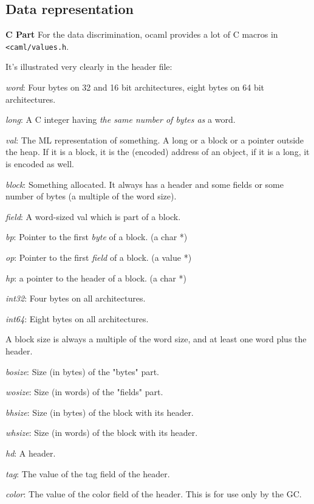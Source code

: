 \subsection{Data representation}
\label{sec:data-representation}


\textbf{C Part} For the data discrimination, ocaml provides a lot of C
macros in \verb|<caml/values.h|.

It's illustrated very clearly in the header file:

\textit{word}: Four bytes on 32 and 16 bit architectures, eight bytes on 64 bit architectures.

\textit{long}: A C integer having \textit{the same number of bytes as}
a word.

\textit{val}: The ML representation of something. A long or a block or
a pointer outside the heap.  If it is a block, it is the (encoded)
address of an object, if it is a long, it is encoded as well.

\textit{block}: Something allocated.  It always has a header and some
fields or some number of bytes (a multiple of the word size).

\textit{field}: A word-sized val which is part of a block.

\textit{bp}: Pointer to the first \textit{byte} of a block.  (a char *)

\textit{op}: Pointer to the first \textit{field} of a block.  (a value
*)

\textit{hp}: a pointer to the header of a block.  (a char *)

\textit{int32}: Four bytes on all architectures.

\textit{int64}: Eight bytes on all architectures.

A block size is always a multiple of the word size, and at least one
word plus the header.

\textit{bosize}: Size (in bytes) of the "bytes" part.

\textit{wosize}: Size (in words) of the "fields" part.

\textit{bhsize}: Size (in bytes) of the block with its header.

\textit{whsize}: Size (in words) of the block with its header.

\textit{hd}: A header.

\textit{tag}: The value of the tag field of the header.

\textit{color}: The value of the color field of the header.  This is
for use only by the GC.

